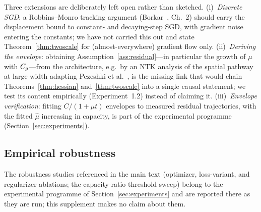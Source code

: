 \begin{remark}
\label{rem:thm2_open}
Three extensions are deliberately left open rather than sketched.
(i)~\emph{Discrete SGD}: a Robbins--Monro tracking argument
(Borkar~\cite{borkar2008stochastic}, Ch.~2) should carry the
displacement bound to constant- and decaying-step SGD, with
gradient noise entering the constants; we have not carried this out
and state Theorem~\ref{thm:twoscale} for (almost-everywhere)
gradient flow only. (ii)~\emph{Deriving the envelope}: obtaining
Assumption~\ref{ass:residual}---in particular the growth of $\mu$
with $C_g$---from the architecture, e.g.\ by an NTK analysis of the
spatial pathway at large width adapting Pezeshki et
al.~\cite{pezeshki2021gradient}, is the missing link that would
chain Theorems~\ref{thm:hessian} and~\ref{thm:twoscale} into a
single causal statement; we test its content empirically
(Experiment~1.2) instead of claiming it. (iii)~\emph{Envelope
verification}: fitting $C/(1+\mu t)$ envelopes to measured residual
trajectories, with the fitted $\hat{\mu}$ increasing in capacity,
is part of the experimental programme
(Section~\ref{sec:experiments}).
\end{remark}

\subsection{Empirical robustness}

The robustness studies referenced in the main text (optimizer,
loss-variant, and regularizer ablations; the capacity-ratio
threshold sweep) belong to the experimental programme of
Section~\ref{sec:experiments} and are reported there as they are
run; this supplement makes no claim about them.
